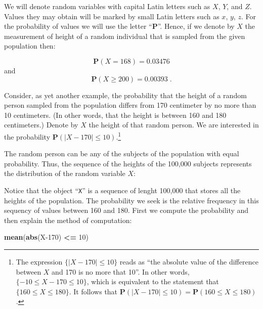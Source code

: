 \documentclass[]{krantz}
\makeatletter
\newenvironment{Shaded}{\begin{snugshade}}{\end{snugshade}}
\newcommand{\DataTypeTok}[1]{\textcolor[rgb]{0.13,0.29,0.53}{#1}}
\newcommand{\DecValTok}[1]{\textcolor[rgb]{0.00,0.00,0.81}{#1}}
\newcommand{\FloatTok}[1]{\textcolor[rgb]{0.00,0.00,0.81}{#1}}
\newcommand{\KeywordTok}[1]{\textcolor[rgb]{0.13,0.29,0.53}{\textbf{#1}}}
\newcommand{\NormalTok}[1]{#1}
\newcommand{\OperatorTok}[1]{\textcolor[rgb]{0.81,0.36,0.00}{\textbf{#1}}}
\newcommand{\StringTok}[1]{\textcolor[rgb]{0.31,0.60,0.02}{#1}}
\newcommand{\Prob}{\mathbf{P}}
\newenvironment{kframe}{%
\medskip{}
\setlength{\fboxsep}{.8em}
 \def\at@end@of@kframe{}%
 \ifinner\ifhmode%
  \def\at@end@of@kframe{\end{minipage}}%
  \begin{minipage}{\columnwidth}%
 \fi\fi%
 \def\FrameCommand##1{\hskip\@totalleftmargin \hskip-\fboxsep
 \colorbox{shadecolor}{##1}\hskip-\fboxsep
     \hskip-\linewidth \hskip-\@totalleftmargin \hskip\columnwidth}%
 \MakeFramed {\advance\hsize-\width
   \@totalleftmargin\z@ \linewidth\hsize
   \@setminipage}}%
 {\par\unskip\endMakeFramed%
 \at@end@of@kframe}
\renewenvironment{Shaded}{\begin{kframe}}{\end{kframe}}
\theoremstyle{definition}
\theoremstyle{definition}
\theoremstyle{definition}
\theoremstyle{remark}
\makeatother
\begin{document}
We will denote random variables with capital Latin letters such as \(X\),
\(Y\), and \(Z\). Values they may obtain will be marked by small Latin
letters such as \(x\), \(y\), \(z\). For the probability of values we will use
the letter ``\(\Prob\)''. Hence, if we denote by \(X\) the measurement of
height of a random individual that is sampled from the given population
then:

\[\Prob(X = 168) = 0.03476\] and
\[\Prob(X \geq 200) = 0.00393\;.\]

Consider, as yet another example, the probability that the height of a
random person sampled from the population differs from 170 centimeter by
no more than 10 centimeters. (In other words, that the height is between
160 and 180 centimeters.) Denote by \(X\) the height of that random
person. We are interested in the probability
\(\Prob(|X -170| \leq 10)\).\footnote{The expression \(\{|X -170| \leq 10\}\) reads as ``the absolute value
  of the difference between \(X\) and 170 is no more that 10''. In other
  words, \(\{-10 \leq X - 170 \leq 10\}\), which is equivalent to the
  statement that \(\{160 \leq X \leq 180\}\). It follows that
  \(\Prob(|X-170|\leq 10) = \Prob(160\leq X \leq 180)\).}

The random person can be any of the subjects of the population with
equal probability. Thus, the sequence of the heights of the 100,000
subjects represents the distribution of the random variable \(X\):

\begin{Shaded}
\end{Shaded}

Notice that the object ``\texttt{X}'' is a sequence of lenght 100,000 that stores
all the heights of the population. The probability we seek is the
relative frequency in this sequency of values between 160 and 180. First
we compute the probability and then explain the method of computation:

\begin{Shaded}
\begin{Highlighting}[]
\KeywordTok{mean}\NormalTok{(}\KeywordTok{abs}\NormalTok{(X}\DecValTok{-170}\NormalTok{) }\OperatorTok{<=}\StringTok{ }\DecValTok{10}\NormalTok{)}
\end{Highlighting}
\end{Shaded}
\end{document}
